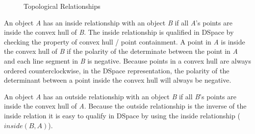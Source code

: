 \documentclass[12pt]{ucthesis}
\begin{document}
\begin{figure}[t]
 \centering
 \hspace{4 mm}
  \hspace{4 mm}
 \hspace{2 mm}
 \caption{Topological Relationships}
\label{topoloy}
\end{figure}

An object \emph{A} has an inside relationship with an object \emph{B} if all \emph{A}'s points are inside the convex hull of \emph{B}. The inside relationship is qualified in DSpace by checking the property of convex hull / point containment. A point in \emph{A} is inside the convex hull of \emph{B} if the polarity of the determinate between the point in \emph{A} and each line segment in \emph{B} is negative. Because points in a convex hull are always ordered counterclockwise, in the DSpace representation, the polarity of the determinant between a point inside the convex hull will always be negative. 

An object \emph{A} has an outside relationship with an object \emph{B} if all \emph{B}'s points are inside the convex hull of \emph{A}. Because the outside relationship is the inverse of the inside relation it is easy to qualify in DSpace by using the inside relationship ($inside(B,A)$). 
\end{document}
